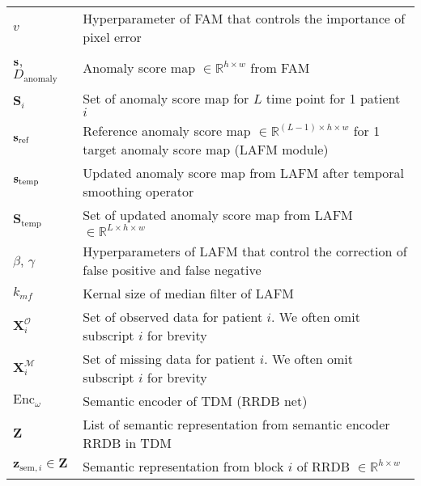 \documentclass[11pt, a4paper, openany]{book}
\begin{document}
\begin{tabular}{l@{\hspace{1.5cm}}p{13cm}}
  $v$ & Hyperparameter of FAM that controls the importance of pixel error \\
  ${\mathbf{s}}$, $D_{\text{anomaly}}$ & Anomaly score map $\in \mathbb{R}^{h \times w}$ from FAM \\
  $\mathbf{S}_i$ & Set of anomaly score map for $L$ time point for 1 patient $i$ \\
  ${\mathbf{s}}_{\text{ref}}$ & Reference anomaly score map $\in \mathbb{R}^{(L-1) \times h \times w}$ for 1 target anomaly score map (LAFM module)\\
  ${\mathbf{s}}_{\text{temp}}$ & Updated anomaly score map from LAFM after temporal smoothing operator \\
  $\mathbf{S}_{\text{temp}}$ & Set of updated anomaly score map from LAFM $\in \mathbb{R}^{L \times h \times w}$ \\
  $\beta$, $\gamma$ & Hyperparameters of LAFM that control the correction of false positive and false negative \\
  $k_{mf}$ & Kernal size of median filter of LAFM \\
  $\mathbf{X}_i^{\mathcal{O}}$ & Set of observed data for patient $i$. We often omit subscript $i$ for brevity \\
  $\mathbf{X}_i^{\mathcal{M}}$ & Set of missing data for patient $i$. We often omit subscript $i$ for brevity \\
  $\text{Enc}_{\omega}$ & Semantic encoder of TDM (RRDB net) \\
  $\mathbf{Z}$ & List of semantic representation from semantic encoder RRDB in TDM \\
  $\mathbf{z}_{\text{sem}, i} \in \mathbf{Z}$ & Semantic representation from block $i$ of RRDB $\in \mathbb{R}^{h \times w}$ \\
\end{tabular}

\listoffigures

\listoftables

\mainmatter














% 
% 
\printbibliography


\end{document}
